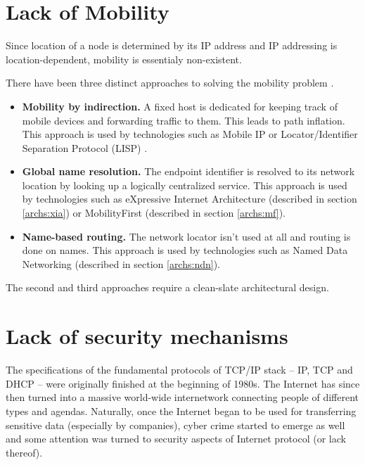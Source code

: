     \section{Lack of Mobility}\label{problems:mobility}

        Since location of a node is determined by its IP address and IP addressing is location-dependent, mobility is essentialy non-existent.

        There have been three distinct approaches to solving the mobility problem \cite{MobilityFirst}.

        \begin{itemize}
            \item \textbf{Mobility by indirection.} A fixed host is dedicated for keeping track of mobile devices and forwarding traffic to them. This leads to path inflation.
            This approach is used by technologies such as Mobile IP \cite{rfc5944} or Locator/Identifier Separation Protocol (LISP) \cite{rfc6830}.
            \item \textbf{Global name resolution.} The endpoint identifier is resolved to its network location by looking up a logically centralized service.
            This approach is used by technologies such as eXpressive Internet Architecture \cite{xia} (described in section \ref{archs:xia}) or MobilityFirst \cite{MobilityFirst} (described in section \ref{archs:mf}).
            \item \textbf{Name-based routing.} The network locator isn't used at all and routing is done on names.
            This approach is used by technologies such as Named Data Networking \cite{ndn} (described in section \ref{archs:ndn}).
        \end{itemize}

        The second and third approaches require a clean-slate architectural design.

    \section{Lack of security mechanisms}\label{problems:security}

        The specifications of the fundamental protocols of TCP/IP stack -- IP, TCP and DHCP -- were originally finished at the beginning of 1980s. The Internet has since then turned into a massive world-wide internetwork connecting people of different types and agendas. Naturally, once the Internet began to be used for transferring sensitive data (especially by companies), cyber crime started to emerge as well and some attention was turned to security aspects of Internet protocol (or lack thereof).

